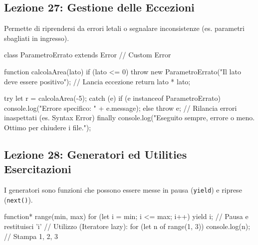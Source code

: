 \documentclass[a4paper,10pt]{article}
\begin{document}
\subsection{Lezione 27: Gestione delle Eccezioni}
Permette di riprendersi da errori letali o segnalare inconsistenze (es. parametri sbagliati in ingresso).
\begin{jsbox}[title={Snippet: Costrutto Try-Catch-Finally ed Errori Custom}]
class ParametroErrato extends Error { } // Custom Error

function calcolaArea(lato) {
    if (lato <= 0) throw new ParametroErrato("Il lato deve essere positivo"); // Lancia eccezione
    return lato * lato;
}

try {
    let r = calcolaArea(-5);
} catch (e) {
    if (e instanceof ParametroErrato) console.log("Errore specifico: " + e.message);
    else throw e; // Rilancia errori inaspettati (es. Syntax Error)
} finally {
    console.log("Eseguito sempre, errore o meno. Ottimo per chiudere i file.");
}
\end{jsbox}

\subsection{Lezione 28: Generatori ed Utilities Esercitazioni}
I generatori sono funzioni che possono essere messe in pausa (\texttt{yield}) e riprese (\texttt{next()}).

\begin{jsbox}[title={Snippet: Function* e Yield}]
function* range(min, max) {
    for (let i = min; i <= max; i++) {
        yield i; // Pausa e restituisci 'i'
    }
}
// Utilizzo (Iteratore lazy):
for (let n of range(1, 3)) console.log(n); // Stampa 1, 2, 3
\end{jsbox}

\ifx\isStandalone\undefined
\end{document}
